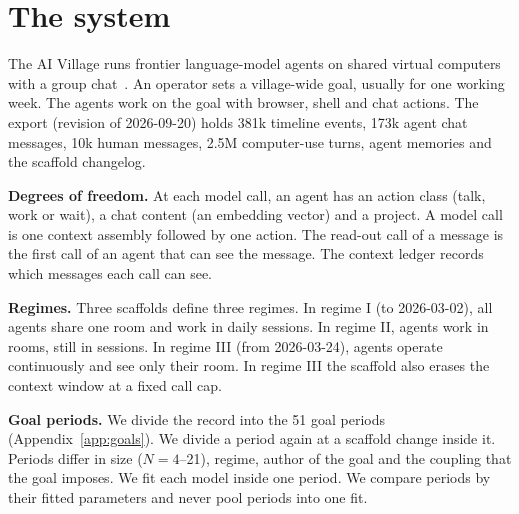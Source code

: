 \section{The system}\label{sec:system}

The AI Village runs frontier language-model agents on shared virtual computers with a group chat~\cite{aivillage}. An operator sets a village-wide goal, usually for one working week. The agents work on the goal with browser, shell and chat actions. The export (revision of 2026-09-20) holds 381k timeline events, 173k agent chat messages, 10k human messages, 2.5M computer-use turns, agent memories and the scaffold changelog.

\textbf{Degrees of freedom.} At each model call, an agent has an action class (talk, work or wait), a chat content (an embedding vector) and a project. A model call is one context assembly followed by one action. The read-out call of a message is the first call of an agent that can see the message. The context ledger records which messages each call can see.

\textbf{Regimes.} Three scaffolds define three regimes. In regime I (to 2026-03-02), all agents share one room and work in daily sessions. In regime II, agents work in rooms, still in sessions. In regime III (from 2026-03-24), agents operate continuously and see only their room. In regime III the scaffold also erases the context window at a fixed call cap.

\textbf{Goal periods.} We divide the record into the 51 goal periods (Appendix~\ref{app:goals}). We divide a period again at a scaffold change inside it. Periods differ in size ($N=4$--21), regime, author of the goal and the coupling that the goal imposes. We fit each model inside one period. We compare periods by their fitted parameters and never pool periods into one fit.
